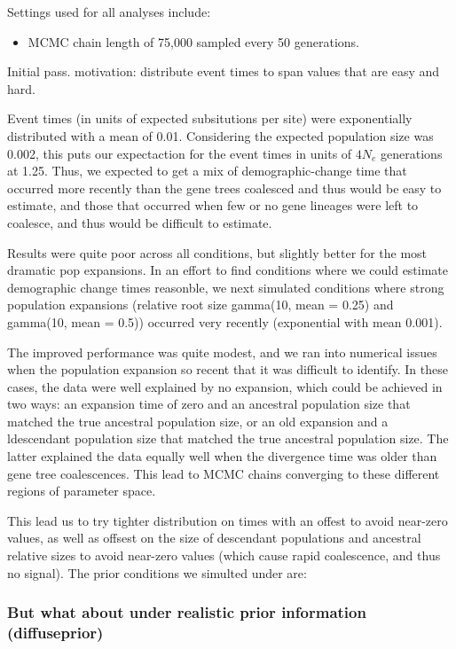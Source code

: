Settings used for all analyses include:
\begin{itemize}
    \item MCMC chain length of 75,000 sampled every 50 generations.
\end{itemize}

Initial pass. motivation: distribute event times to span values that are easy and hard.

Event times (in units of expected subsitutions per site) were exponentially
distributed with a mean of 0.01.
Considering the expected population size was 0.002, this puts our expectaction
for the event times in units of $4N_e$ generations at 1.25.
Thus, we expected to get a mix of demographic-change time that occurred more recently
than the gene trees coalesced and thus would be easy to estimate,
and those that occurred when few or no gene lineages were left to coalesce, and thus would
be difficult to estimate.

Results were quite poor across all conditions, but slightly better for the most dramatic pop expansions.
In an effort to find conditions where we could estimate demographic change times reasonble, we next simulated conditions where strong population expansions (relative root size gamma(10, mean = 0.25) and gamma(10, mean = 0.5)) occurred very recently (exponential with mean 0.001).

The improved performance was quite modest, and we ran into numerical issues when the
population expansion so recent that it was difficult to identify.
In these cases, the data were well explained by no expansion, which could be achieved in two ways: an expansion time of zero and an ancestral population size that matched the true ancestral population size, or an old expansion and a ldescendant population size that matched the true ancestral population size. The latter explained the data equally well when the divergence time was older than gene tree coalescences. This lead to MCMC chains converging to these different regions of parameter space.

This lead us to try tighter distribution on times with an offest to avoid
near-zero values, as well as offsest on the size of descendant populations and
ancestral relative sizes to avoid near-zero values (which cause rapid
coalescence, and thus no signal). The prior conditions we simulted under are:


\subsubsection{But what about under realistic prior information (diffuseprior)}

